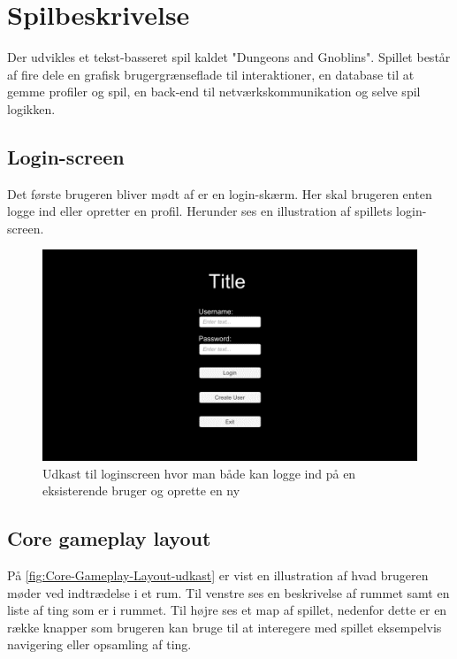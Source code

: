\newpage

\section{Spilbeskrivelse}

Der udvikles et tekst-basseret spil kaldet "Dungeons and Gnoblins". Spillet består af fire dele en grafisk brugergrænseflade til interaktioner, en database til at gemme profiler og spil, en back-end til netværkskommunikation og selve spil logikken.

\subsection{Login-screen}
Det første brugeren bliver mødt af er en login-skærm. Her skal brugeren enten logge ind eller opretter en profil.  Herunder ses en illustration af spillets login-screen. 

\begin{figure}[H]
\centering
\includegraphics[width = \textwidth]{02-Body/Images/Loginscreen-udkast.png}
\caption{Udkast til loginscreen hvor man både kan logge ind på en eksisterende bruger og oprette en ny}
\label{fig:Loginscreen-udkast}
\end{figure}

\subsection{Core gameplay layout}
På \autoref{fig:Core-Gameplay-Layout-udkast} er vist en illustration af hvad brugeren møder ved indtrædelse i et rum. Til venstre ses en beskrivelse af rummet samt en liste af ting som er i rummet. Til højre ses et map af spillet, nedenfor dette er en række knapper som brugeren kan bruge til at interegere med spillet eksempelvis navigering eller opsamling af ting.


